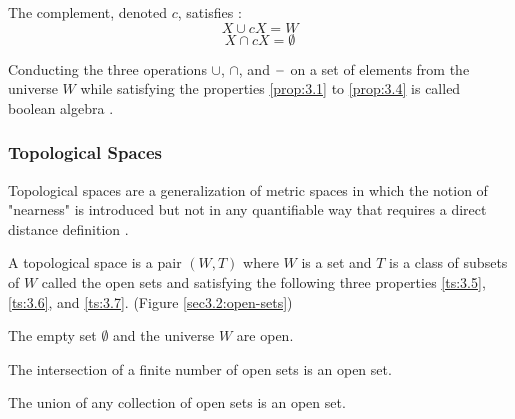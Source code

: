 \documentclass[a4paper,11pt,oneside]{article}
\newcommand{\minus}{\scalebox{0.9}[1.0]{$-$}} %
\begin{document}
\begin{property}
	\label{prop:3.4}
	The complement, denoted $c$, satisfies \cite{mansfield_1987}:
	\begin{equation*}	
		X \cup cX = W
	\end{equation*}
	\begin{equation*}
		X \cap cX = \emptyset
	\end{equation*}
\end{property}


    
\begin{definition}
	Conducting the three operations $\cup$, $\cap$, and $\minus$ on a set of elements from the universe $W$ while satisfying the properties \eqref{prop:3.1} to \eqref{prop:3.4} is called boolean algebra \cite{Requicha1978MathematicalFO}.
\end{definition}
    
\subsubsection{Topological Spaces}
    
Topological spaces are a generalization of metric spaces in which the notion of "nearness" is introduced but not in any quantifiable way that requires a direct distance definition \cite{mansfield_1987}.
    
\begin{definition}
	A topological space is a pair $(W, T)$ where $W$ is a set and $T$ is a class of subsets of $W$ called the open sets and satisfying the following three properties \ref{ts:3.5}, \ref{ts:3.6}, and \ref{ts:3.7}. (Figure \ref{sec3.2:open-sets})
	\begin{property}
		\label{ts:3.5}
		The empty set $\emptyset$ and the universe $W$ are open.\cite{mansfield_1987}
	\end{property}
	\begin{property}
		\label{ts:3.6}
		The intersection of a finite number of open sets is an open set. \cite{mansfield_1987}
	\end{property}
	\begin{property}
		\label{ts:3.7}
		The union of any collection of open sets is an open set. \cite{mansfield_1987}
	\end{property}
\end{definition}
\end{document}
